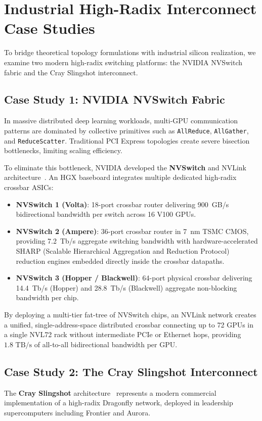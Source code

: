 \section{Industrial High-Radix Interconnect Case Studies}
\label{sec:ch4_case_studies}

To bridge theoretical topology formulations with industrial silicon realization, we examine two modern high-radix switching platforms: the NVIDIA NVSwitch fabric and the Cray Slingshot interconnect.

\subsection{Case Study 1: NVIDIA NVSwitch Fabric}
In massive distributed deep learning workloads, multi-GPU communication patterns are dominated by collective primitives such as \texttt{AllReduce}, \texttt{AllGather}, and \texttt{ReduceScatter}. Traditional PCI Express topologies create severe bisection bottlenecks, limiting scaling efficiency.

To eliminate this bottleneck, NVIDIA developed the \textbf{NVSwitch} and NVLink architecture~\cite{Foley2023}. An HGX baseboard integrates multiple dedicated high-radix crossbar ASICs:
\begin{itemize}
    \item \textbf{NVSwitch 1 (Volta)}: 18-port crossbar router delivering 900~GB/s bidirectional bandwidth per switch across 16 V100 GPUs.
    \item \textbf{NVSwitch 2 (Ampere)}: 36-port crossbar router in 7~nm TSMC CMOS, providing 7.2~Tb/s aggregate switching bandwidth with hardware-accelerated SHARP (Scalable Hierarchical Aggregation and Reduction Protocol) reduction engines embedded directly inside the crossbar datapaths.
    \item \textbf{NVSwitch 3 (Hopper / Blackwell)}: 64-port physical crossbar delivering 14.4~Tb/s (Hopper) and 28.8~Tb/s (Blackwell) aggregate non-blocking bandwidth per chip.
\end{itemize}
By deploying a multi-tier fat-tree of NVSwitch chips, an NVLink network creates a unified, single-address-space distributed crossbar connecting up to 72 GPUs in a single NVL72 rack without intermediate PCIe or Ethernet hops, providing $1.8\text{ TB/s}$ of all-to-all bidirectional bandwidth per GPU.

\subsection{Case Study 2: The Cray Slingshot Interconnect}
The \textbf{Cray Slingshot} architecture~\cite{DeSensi2020} represents a modern commercial implementation of a high-radix Dragonfly network, deployed in leadership supercomputers including Frontier and Aurora.

